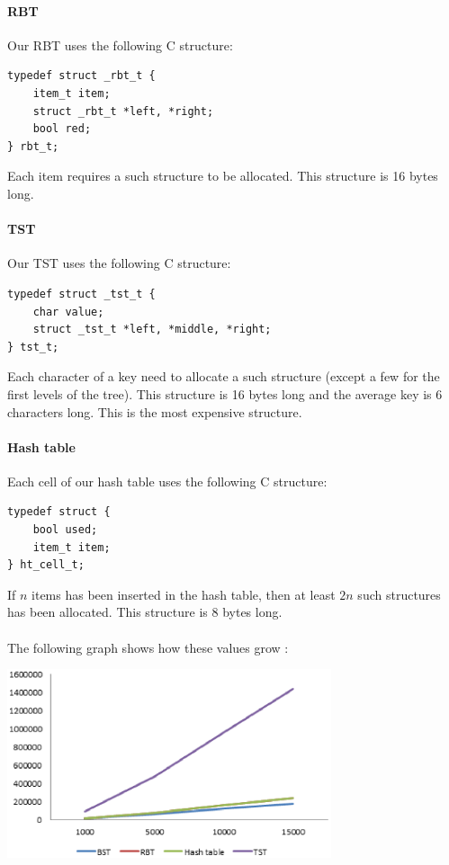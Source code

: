\documentclass[a4paper]{article}
\begin{document}
    \paragraph{RBT} Our RBT uses the following C structure:
\begin{lstlisting}
typedef struct _rbt_t {
    item_t item;
    struct _rbt_t *left, *right;
    bool red;
} rbt_t;
\end{lstlisting}
Each item requires a such structure to be allocated. This structure is 16 bytes
long.

    \paragraph{TST} Our TST uses the following C structure:
\begin{lstlisting}
typedef struct _tst_t {
    char value;
    struct _tst_t *left, *middle, *right;
} tst_t;
\end{lstlisting}
Each character of a key need to allocate a such structure (except a few for
the first levels of the tree). This structure is 16 bytes long and the average
key is 6 characters long. This is the most expensive structure.

    \paragraph{Hash table} Each cell of our hash table uses the following
C structure:
\begin{lstlisting}
typedef struct {
    bool used;
    item_t item;
} ht_cell_t;
\end{lstlisting}
If $n$ items has been inserted in the hash table, then at least $2n$ such 
structures has been allocated. This structure is 8 bytes long.

    \paragraph{} The following graph shows how these values grow :

    \begin{center}
        \includegraphics[width=270pt]{memory.eps}
    \end{center}
\end{document}
